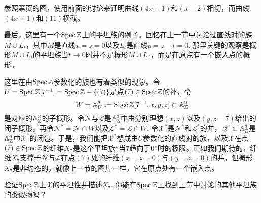 \begin{exe}\label{e.2.44}
参照第\pageref{p.2.18}页的图，使用前面的讨论来证明曲线$(4x + 1)$和$(x-2)$相切，而曲线$(4x + 1)$和$(11)$横截。
\end{exe}

最后，这里有一个$\operatorname{Spec} \mathbb{Z}$上的平坦族的例子。回忆在上一节中讨论过直线对的族$M\cup L_t$，其中$M$是直线$x=z=0$以及$L_t$是直线$y=z-t=0$. 那里关键的观察是概形$M\cup L_t$的平坦族当$t\to 0$时并不是概形$M\cup L_0$，而是在原点有一个嵌入点的概形。

这里在由$\operatorname{Spec} \mathbb{Z}$参数化的族也有着类似的现象。令$U=\operatorname{Spec} \mathbb{Z}[7^{-1}]=\operatorname{Spec} \mathbb{Z}-\{(7)\}$是点$(7)\in\operatorname{Spec}\mathbb{Z}$的补，令
\[
	W=\mathbb{A}_U^3:=\operatorname{Spec} \mathbb{Z}[7^{-1},x,y,z]\subset \mathbb{A}_{\mathbb{Z}}^2
\]
是对应的$\mathbb{A}_{\mathbb{Z}}^3$的子概形。令$\mathscr{N}$与$\mathscr{L}$是$\mathbb{A}_{\mathbb{Z}}^3$中由分别理想$(x,z)$以及$(y,z-7)$给出的闭子概形，再令$\mathscr{N}^*=\mathscr{N}\cap W$以及$\mathscr{L}^*=\mathscr{L}\cap W$. 令$\mathscr{X}^*$是$\mathscr{N}^*$和$\mathscr{L}^*$的并，$\mathscr{X}\subset \mathbb{A}_{\mathbb{Z}}^3$是$\mathbb{A}_{\mathbb{Z}}^3$中$\mathscr{X}^*$的闭包。于是，我们能把$\mathscr{X}^*$想成由$U$参数化的直线对的族，以及$\mathscr{X}$在点$(7)\in\operatorname{Spec} \mathbb{Z}$的纤维$X_7$是这个平坦族“当$7$趋向于$0$”时的极限。正如我们期待的，纤维$X_7$支撑于$\mathscr{N}$与$\mathscr{L}$在点$(7)$处的纤维$(x=z=0)$与$(y=z=0)$的并，但概形$X_7$是非约态的，就像上一节的图片一样，它在原点处有一个嵌入点。

\begin{exe}
验证$\operatorname{Spec}\mathbb{Z}$上$\mathscr{X}$的平坦性并描述$X_7$. 你能在$\operatorname{Spec}\mathbb{Z}$上找到上节中讨论的其他平坦族的类似物吗？
\end{exe}